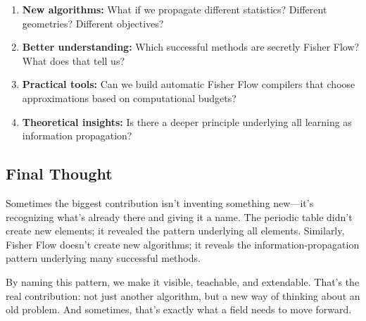 \documentclass[11pt]{article}
\begin{document}
\begin{enumerate}
\item \textbf{New algorithms:} What if we propagate different statistics? Different geometries? Different objectives?
\item \textbf{Better understanding:} Which successful methods are secretly Fisher Flow? What does that tell us?
\item \textbf{Practical tools:} Can we build automatic Fisher Flow compilers that choose approximations based on computational budgets?
\item \textbf{Theoretical insights:} Is there a deeper principle underlying all learning as information propagation?
\end{enumerate}

\subsection{Final Thought}

Sometimes the biggest contribution isn't inventing something new—it's recognizing what's already there and giving it a name. The periodic table didn't create new elements; it revealed the pattern underlying all elements. Similarly, Fisher Flow doesn't create new algorithms; it reveals the information-propagation pattern underlying many successful methods.

By naming this pattern, we make it visible, teachable, and extendable. That's the real contribution: not just another algorithm, but a new way of thinking about an old problem. And sometimes, that's exactly what a field needs to move forward.
\end{document}
